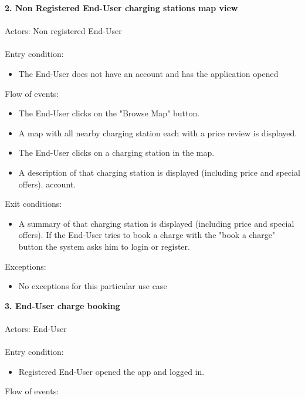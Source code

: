 \documentclass[a4paper]{report}
\begin{document}
\textbf{2. Non Registered End-User charging stations map view}\label{uc:1}
\\
\\
Actors: Non registered End-User\\ \\
Entry condition:
\begin{itemize}
\item The End-User does not have an account and has the application opened
\end{itemize}
Flow of events:
\begin{itemize}
\item The End-User clicks on the "Browse Map" button.
\item A map with all nearby charging station each with a price review is displayed.
\item The End-User clicks on a charging station in the map.
\item A description of that charging station is displayed (including price and special offers).
 account.
\end{itemize}
Exit conditions:
\begin{itemize}
\item A summary of that charging station is displayed (including price and special offers). If the End-User tries to book a charge with the "book a charge" button the system asks him to login or register.
\end{itemize}
Exceptions:
\begin{itemize}
\item No exceptions for this particular use case
\end{itemize}
\textbf{3. End-User charge booking}\label{uc:4}
\\
\\
Actors: End-User \\ \\
Entry condition:
\begin{itemize}
\item Registered End-User opened the app and logged in.
\end{itemize}
Flow of events:
\end{document}
